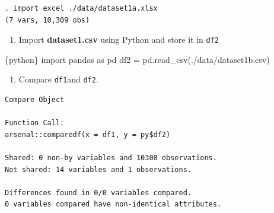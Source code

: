 \documentclass[
  letterpaper,
  DIV=11,
  numbers=noendperiod,
  oneside]{scrreprt}
\newenvironment{Shaded}{\begin{snugshade}}{\end{snugshade}}
\newcommand{\FunctionTok}[1]{\textcolor[rgb]{0.28,0.35,0.67}{#1}}
\newcommand{\ImportTok}[1]{\textcolor[rgb]{0.00,0.46,0.62}{#1}}
\newcommand{\InformationTok}[1]{\textcolor[rgb]{0.37,0.37,0.37}{#1}}
\newcommand{\NormalTok}[1]{\textcolor[rgb]{0.00,0.23,0.31}{#1}}
\newcommand{\OperatorTok}[1]{\textcolor[rgb]{0.37,0.37,0.37}{#1}}
\newcommand{\SpecialCharTok}[1]{\textcolor[rgb]{0.37,0.37,0.37}{#1}}
\newcommand{\StringTok}[1]{\textcolor[rgb]{0.13,0.47,0.30}{#1}}
\providecommand{\tightlist}{%
  \setlength{\itemsep}{0pt}\setlength{\parskip}{0pt}}\usepackage{longtable,booktabs,array}
\begin{document}
\begin{verbatim}
. import excel ./data/dataset1a.xlsx
(7 vars, 10,309 obs)
\end{verbatim}

\begin{enumerate}
\def\labelenumi{\arabic{enumi}.}
\setcounter{enumi}{1}
\tightlist
\item
  Import \textbf{dataset1.csv} using Python and store it in \texttt{df2}
\end{enumerate}

\begin{Shaded}
\begin{Highlighting}[]
\InformationTok{\textasciigrave{}\textasciigrave{}\textasciigrave{}\{python\}}
\ImportTok{import}\NormalTok{ pandas }\ImportTok{as}\NormalTok{ pd}
\NormalTok{df2 }\OperatorTok{=}\NormalTok{ pd.read\_csv(}\StringTok{\textquotesingle{}./data/dataset1b.csv\textquotesingle{}}\NormalTok{)}
\InformationTok{\textasciigrave{}\textasciigrave{}\textasciigrave{}}
\end{Highlighting}
\end{Shaded}

\begin{enumerate}
\def\labelenumi{\arabic{enumi}.}
\setcounter{enumi}{2}
\tightlist
\item
  Compare \texttt{df1}and \texttt{df2}.
\end{enumerate}

\begin{Shaded}
\end{Shaded}

\begin{verbatim}
Compare Object

Function Call: 
arsenal::comparedf(x = df1, y = py$df2)

Shared: 0 non-by variables and 10308 observations.
Not shared: 14 variables and 1 observations.

Differences found in 0/0 variables compared.
0 variables compared have non-identical attributes.
\end{verbatim}
\end{document}
